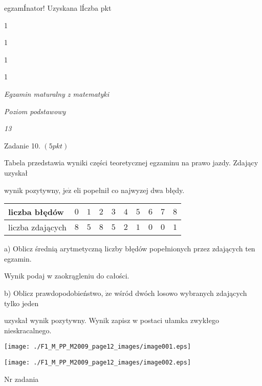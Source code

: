 \documentclass[a4paper,12pt]{article}
\begin{document}
egzamÍnator! Uzyskana lÍczba pkt

1

1

1

1





{\it Egzamin maturalny z matematyki}

{\it Poziom podstawowy}

{\it 13}

Zadanie 10. $(5pkt)$

Tabela przedstawia wyniki części teoretycznej egzaminu na prawo jazdy. Zdający uzyskał

wynik pozytywny, $\mathrm{j}\mathrm{e}\dot{\mathrm{z}}$ eli popełnił co najwyzej dwa błędy.
\begin{center}
\begin{tabular}{|l|l|l|l|l|l|l|l|l|l|}
\hline
\multicolumn{1}{|l|}{liczba błędów}&	\multicolumn{1}{|l|}{$0$}&	\multicolumn{1}{|l|}{ $1$}&	\multicolumn{1}{|l|}{ $2$}&	\multicolumn{1}{|l|}{ $3$}&	\multicolumn{1}{|l|}{ $4$}&	\multicolumn{1}{|l|}{ $5$}&	\multicolumn{1}{|l|}{ $6$}&	\multicolumn{1}{|l|}{ $7$}&	\multicolumn{1}{|l|}{ $8$}	\\
\hline
\multicolumn{1}{|l|}{liczba zdających}&	\multicolumn{1}{|l|}{$8$}&	\multicolumn{1}{|l|}{ $5$}&	\multicolumn{1}{|l|}{ $8$}&	\multicolumn{1}{|l|}{ $5$}&	\multicolumn{1}{|l|}{ $2$}&	\multicolumn{1}{|l|}{ $1$}&	\multicolumn{1}{|l|}{ $0$}&	\multicolumn{1}{|l|}{ $0$}&	\multicolumn{1}{|l|}{ $1$}	\\
\hline
\end{tabular}

\end{center}
a) Oblicz średnią arytmetyczną liczby błędów popełnionych przez zdających ten egzamin.

Wynik podaj w zaokrągleniu do całości.

b) Oblicz prawdopodobieństwo, $\dot{\mathrm{z}}\mathrm{e}$ wśród dwóch losowo wybranych zdających tylko jeden

uzyskał wynik pozytywny. Wynik zapisz w postaci ułamka zwykłego nieskracalnego.
\begin{center}
\texttt{[image: ./F1\_M\_PP\_M2009\_page12\_images/image001.eps]}

\texttt{[image: ./F1\_M\_PP\_M2009\_page12\_images/image002.eps]}
\end{center}
Nr zadania
\end{document}
